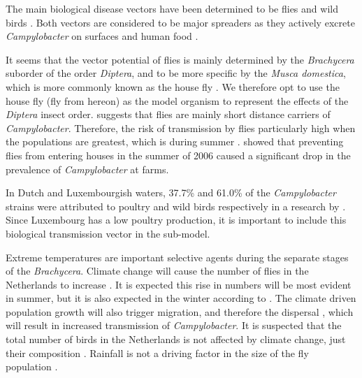 The main biological disease vectors have been determined to be flies and wild birds \parencite{mughini-gras_quantifying_2016}. Both vectors are considered to be major spreaders as they actively excrete \textit{Campylobacter} on surfaces and human food \parencite{french_molecular_2009, hald_influxed_2008, berndtson_campylobacter_1996}.

It seems that the vector potential of flies is mainly determined by the \textit{Brachycera} suborder of the order \textit{Diptera}, and to be more specific by the \textit{Musca domestica}, which is more commonly known as the house fly \parencite{hald_influxed_2008}. We therefore opt to use the house fly (fly from hereon) as the model organism to represent the effects of the \textit{Diptera} insect order. \cite{skovgard_retention_2011} suggests that flies are mainly short distance carriers of \textit{Campylobacter}. Therefore, the risk of transmission by flies particularly high when the populations are greatest, which is during summer \parencite{royden_role_2016}. \cite{hald_use_2007} showed that preventing flies from entering houses in the summer of 2006 caused a significant drop in the prevalence of \textit{Campylobacter} at farms.

In Dutch and Luxembourgish waters, 37.7\% and 61.0\% of the \textit{Campylobacter} strains were attributed to poultry and wild birds respectively in a research by \cite{mughini-gras_quantifying_2016}. Since Luxembourg has a low poultry production, it is important to include this biological transmission vector in the sub-model.

Extreme temperatures are important selective agents during the separate stages of the \textit{Brachycera}. Climate change will cause the number of flies in the Netherlands to increase \parencite{goulson_predicting_2005}. It is expected this rise in numbers will be most evident in summer, but it is also expected in the winter according to \citeauthor{goulson_predicting_2005}. The climate driven population growth will also trigger migration, and therefore the dispersal \parencite{feder_locomotion_2010}, which will result in increased transmission of \textit{Campylobacter}. It is suspected that the total number of birds in the Netherlands is not affected by climate change, just their composition \parencite{mclean_reduced_2020, knudsen_challenging_2011}. Rainfall is not a driving factor in the size of the fly population \parencite{goulson_predicting_2005}.


